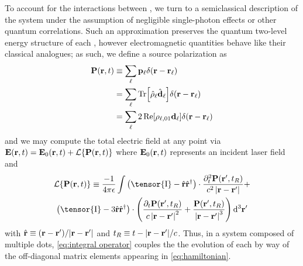 To account for the interactions between \qds{}, we turn to a semiclassical description of the system under the assumption of negligible single-photon effects or other quantum correlations.
Such an approximation preserves the quantum two-level energy structure of each \qd{}, however electromagnetic quantities behave like their classical analogues;
as such, we define a source polarization as
\begin{equation}
  \begin{aligned}
    \vb{P}(\vb{r}, t) &\equiv \sum_\ell \vb{p}_\ell \delta(\vb{r} - \vb{r}_\ell) \\
                      &= \sum_\ell \Tr[\hat{\rho}_\ell \hat{\vb{d}}_\ell] \delta(\vb{r} - \vb{r}_\ell) \\
                      &= \sum_\ell 2 \Re[\rho_{\ell,01}\vb{d}_\ell]\delta(\vb{r} - \vb{r}_\ell) \\
  \end{aligned}
\end{equation}
and we may compute the total electric field at any point via $\vb{E}(\vb{r}, t) = \vb{E}_0(\vb{r}, t) + \mathcal{L}\{\vb{P}(\vb{r}, t)\}$
where $\vb{E}_0(\vb{r}, t)$ represents an incident laser field and
\begin{equation}
  \begin{gathered}
    \mathcal{L}\{\vb{P}(\vb{r}, t)\} \equiv
      \frac{-1}{4\pi \epsilon} \int
      \left(\tensor{\mathrm{I}} -  \hat{\mathbf{r}}\hat{\mathbf{r}}^\dagger\right) \cdot \frac{\partial_t^2 \mathbf{P}(\mathbf{r}', t_R)}{c^2 \left|\mathbf{r}-\mathbf{r}'\right|} + \\
      \left(\tensor{\mathrm{I}} - 3\hat{\mathbf{r}}\hat{\mathbf{r}}^\dagger\right) \cdot \qty(
        \frac{\partial_t   \mathbf{P}(\mathbf{r}', t_R)}{c   \left|\mathbf{r}-\mathbf{r}'\right|^2} +
        \frac{             \mathbf{P}(\mathbf{r}', t_R)}{    \left|\mathbf{r}-\mathbf{r}'\right|^3}
      )
    \, \mathrm{d}^3 \mathbf{r'}
  \end{gathered}
  \label{eq:integral operator}
\end{equation}
with $\hat{\vb{r}} \equiv \qty(\vb{r} - \vb{r}')/\abs{\vb{r} - \vb{r}'}$ and $t_R \equiv t - \abs{\vb{r} - \vb{r}'}/c$.
Thus, in a system composed of multiple dots, \cref{eq:integral operator} couples the the evolution of each \qd{} by way of the off-diagonal matrix elements appearing in \cref{eq:hamiltonian}.
